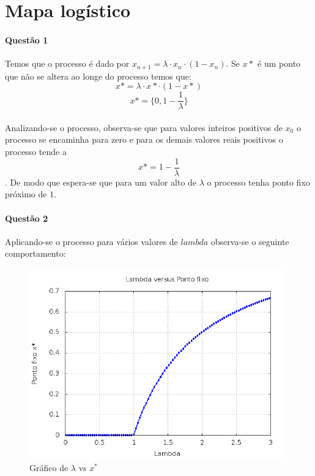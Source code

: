 \documentclass[a4paper,11pt]{article}
\title{\tituloCapa}
\begin{document}

\section{Mapa logístico}

\paragraph{Questão 1}Temos que o processo é dado por $x_{n+1} = \lambda\cdot x_n\cdot (1-x_n)$. Se $x*$ é um ponto que não se altera ao longe do processo temos que:
$$x* = \lambda \cdot x*\cdot(1-x*)$$
\begin{equation}
x* = \{0,1 -\frac{1}{\lambda}\}
\end{equation}
\paragraph{}Analizando-se o processo, observa-se que para valores inteiros positivos de $x_0$ o processo se encaminha para zero e para os demais valores reais positivos o processo tende a $$x* = 1 -\frac{1}{\lambda}$$. De modo que espera-se que para um valor alto de $\lambda$ o processo tenha ponto fixo próximo de $1$.

\paragraph{Questão 2}Aplicando-se o processo para vários valores de $lambda$ observa-se o seguinte comportamento:
\begin{figure}[H]
\includegraphics[width=11cm]{../image/questao2a.png}
\centering
\caption{Gráfico de $\lambda$ vs $x^*$}
\end{figure}
\end{document}
